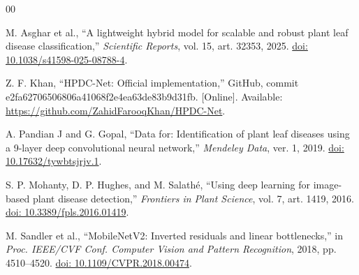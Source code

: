 \documentclass[conference,10pt]{IEEEtran}
\begin{document}
\begin{thebibliography}{00}

M. Asghar et al.,
``A lightweight hybrid model for scalable and robust
plant leaf disease classification,''
\emph{Scientific Reports},
vol. 15, art. 32353, 2025.
\href{https://doi.org/10.1038/s41598-025-08788-4}
{doi: 10.1038/s41598-025-08788-4}.

Z. F. Khan,
``HPDC-Net: Official implementation,''
GitHub, commit e2fa62706506806a41068f2e4ea63de83b9d31fb.
[Online]. Available:
\url{https://github.com/ZahidFarooqKhan/HPDC-Net}.

A. Pandian J and G. Gopal,
``Data for: Identification of plant leaf diseases
using a 9-layer deep convolutional neural network,''
\emph{Mendeley Data}, ver. 1, 2019.
\href{https://doi.org/10.17632/tywbtsjrjv.1}
{doi: 10.17632/tywbtsjrjv.1}.

S. P. Mohanty, D. P. Hughes, and M. Salath\'e,
``Using deep learning for image-based plant disease
detection,''
\emph{Frontiers in Plant Science},
vol. 7, art. 1419, 2016.
\href{https://doi.org/10.3389/fpls.2016.01419}
{doi: 10.3389/fpls.2016.01419}.

M. Sandler et al.,
``MobileNetV2: Inverted residuals and linear
bottlenecks,''
in \emph{Proc. IEEE/CVF Conf. Computer Vision
and Pattern Recognition},
2018, pp. 4510--4520.
\href{https://doi.org/10.1109/CVPR.2018.00474}
{doi: 10.1109/CVPR.2018.00474}.

\end{thebibliography}
\end{document}
